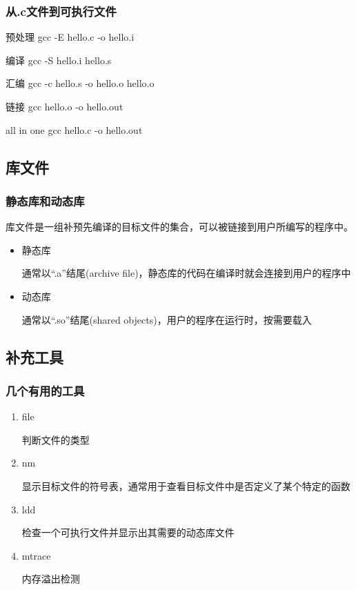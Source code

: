 \documentclass{beamer}
\begin{document}
\begin{frame}
\frametitle{从.c文件到可执行文件}
\begin{block}{预处理}
gcc -E hello.c -o hello.i
\end{block}

\begin{block}{编译}
gcc -S hello.i
hello.s
\end{block}

\begin{block}{汇编}
gcc -c hello.s -o hello.o
hello.o
\end{block}
\begin{block}{链接}
gcc hello.o -o hello.out
\end{block}

\begin{block}{all in one}
gcc hello.c -o hello.out
\end{block}
\end{frame}

\subsection{库文件}
\begin{frame}
\frametitle{静态库和动态库}
库文件是一组补预先编译的目标文件的集合，可以被链接到用户所编写的程序中。
\begin{itemize}
\item 静态库

通常以“.a”结尾(archive file)，静态库的代码在编译时就会连接到用户的程序中
\item 动态库

通常以“.so”结尾(shared objects)，用户的程序在运行时，按需要载入
\end{itemize}

\end{frame}
\subsection{补充工具}
\begin{frame}
\frametitle{几个有用的工具}
\begin{enumerate}
\item file

判断文件的类型
\item nm

显示目标文件的符号表，通常用于查看目标文件中是否定义了某个特定的函数

\item ldd

检查一个可执行文件并显示出其需要的动态库文件

\item
mtrace

内存溢出检测

\end{enumerate}
\end{frame}
\end{document}
